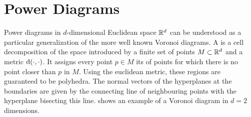 \section{Power Diagrams}
\label{sec:powerdiagrams}
Power diagrams in $d$-dimensional Euclidean space $\mathbb{R}^d$ can be understood as a particular generalization of the more well known Voronoi diagrams.
A  is a cell decomposition of the space introduced by a finite set of points $M \subset \mathbb{R}^d$ and a metric $\operatorname{d}(\cdot, \cdot)$.
It assigns every point $p \in M$ its  of points for which there is no point closer than $p$ in $M$.
Using the euclidean metric, these regions are guaranteed to be polyhedra.
The normal vectors of the hyperplanes at the boundaries are given by the connecting line of neighbouring points with the hyperplane bisecting this line.
 shows an example of a Voronoi diagram in $d = 2$ dimensions.
